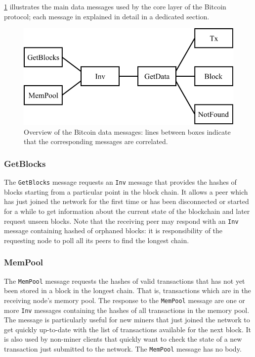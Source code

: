 \medskip
\cref{fig:data-messages} illustrates the main data messages used by the core layer of the Bitcoin protocol;
each message in explained in detail in a dedicated section.

\begin{figure}[ht]
	\centering
	\vspace*{0.25cm}
	\includegraphics[scale=0.85]{figures/data_messages}
	\vspace*{0.25cm}
	\caption[Overview of the Bitcoin data messages]{
		Overview of the Bitcoin data messages:
		lines between boxes indicate that the corresponding messages are correlated.
	}
	\label{fig:data-messages}
\end{figure}

\subsubsection{GetBlocks}
The \texttt{GetBlocks} message requests an \texttt{Inv} message that provides the hashes of blocks starting from a particular point in the block chain.
It allows a peer which has just joined the network for the first time or has been disconnected or started for a while to get information about the current state of the blockchain and later request unseen blocks.
Note that the receiving peer may respond with an \texttt{Inv} message containing hashed of orphaned blocks:
it is responsibility of the requesting node to poll all its peers to find the longest chain.

\subsubsection{MemPool}
The \texttt{MemPool} message requests the hashes of valid transactions that has not yet been stored in a block in the longest chain.
That is, transactions which are in the receiving node’s memory pool.
The response to the \texttt{MemPool} message are one or more \texttt{Inv} messages containing the hashes of all transactions in the memory pool.
The message is particularly useful for new miners that just joined the network to get quickly up-to-date with the list of transactions available for the next block.
It is also used by non-miner clients that quickly want to check the state of a new transaction just submitted to the network.
The \texttt{MemPool} message has no body.

